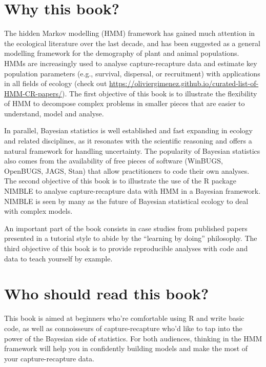 \documentclass[
  12pt,
]{krantz}
\begin{document}
\section*{Why this book?}\label{why-this-book}


The hidden Markov modelling (HMM) framework has gained much attention in the ecological literature over the last decade, and has been suggested as a general modelling framework for the demography of plant and animal populations. HMMs are increasingly used to analyse capture-recapture data and estimate key population parameters (e.g., survival, dispersal, or recruitment) with applications in all fields of ecology (check out \url{https://oliviergimenez.github.io/curated-list-of-HMM-CR-papers/}). The first objective of this book is to illustrate the flexibility of HMM to decompose complex problems in smaller pieces that are easier to understand, model and analyse.

In parallel, Bayesian statistics is well established and fast expanding in ecology and related disciplines, as it resonates with the scientific reasoning and offers a natural framework for handling uncertainty. The popularity of Bayesian statistics also comes from the availability of free pieces of software (WinBUGS, OpenBUGS, JAGS, Stan) that allow practitioners to code their own analyses. The second objective of this book is to illustrate the use of the R package NIMBLE \citep{deValpine2017} to analyse capture-recapture data with HMM in a Bayesian framework. NIMBLE is seen by many as the future of Bayesian statistical ecology to deal with complex models.

An important part of the book consists in case studies from published papers presented in a tutorial style to abide by the ``learning by doing'' philosophy. The third objective of this book is to provide reproducible analyses with code and data to teach yourself by example.

\section*{Who should read this book?}\label{who-should-read-this-book}


This book is aimed at beginners who're comfortable using R and write basic code, as well as connoisseurs of capture-recapture who'd like to tap into the power of the Bayesian side of statistics. For both audiences, thinking in the HMM framework will help you in confidently building models and make the most of your capture-recapture data.
\end{document}
